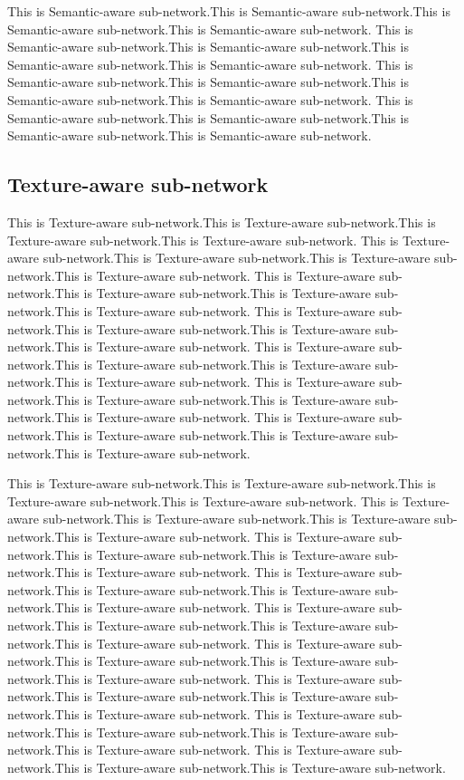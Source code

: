 \documentclass{article}
\begin{document}
This is Semantic-aware sub-network.This is Semantic-aware sub-network.This is Semantic-aware sub-network.This is Semantic-aware sub-network.
This is Semantic-aware sub-network.This is Semantic-aware sub-network.This is Semantic-aware sub-network.This is Semantic-aware sub-network.
This is Semantic-aware sub-network.This is Semantic-aware sub-network.This is Semantic-aware sub-network.This is Semantic-aware sub-network.
This is Semantic-aware sub-network.This is Semantic-aware sub-network.This is Semantic-aware sub-network.This is Semantic-aware sub-network.

\subsection{Texture-aware sub-network}
\label{Texture-aware sub-network}
This is Texture-aware sub-network.This is Texture-aware sub-network.This is Texture-aware sub-network.This is Texture-aware sub-network.
This is Texture-aware sub-network.This is Texture-aware sub-network.This is Texture-aware sub-network.This is Texture-aware sub-network.
This is Texture-aware sub-network.This is Texture-aware sub-network.This is Texture-aware sub-network.This is Texture-aware sub-network.
This is Texture-aware sub-network.This is Texture-aware sub-network.This is Texture-aware sub-network.This is Texture-aware sub-network.
This is Texture-aware sub-network.This is Texture-aware sub-network.This is Texture-aware sub-network.This is Texture-aware sub-network.
This is Texture-aware sub-network.This is Texture-aware sub-network.This is Texture-aware sub-network.This is Texture-aware sub-network.
This is Texture-aware sub-network.This is Texture-aware sub-network.This is Texture-aware sub-network.This is Texture-aware sub-network.

This is Texture-aware sub-network.This is Texture-aware sub-network.This is Texture-aware sub-network.This is Texture-aware sub-network.
This is Texture-aware sub-network.This is Texture-aware sub-network.This is Texture-aware sub-network.This is Texture-aware sub-network.
This is Texture-aware sub-network.This is Texture-aware sub-network.This is Texture-aware sub-network.This is Texture-aware sub-network.
This is Texture-aware sub-network.This is Texture-aware sub-network.This is Texture-aware sub-network.This is Texture-aware sub-network.
This is Texture-aware sub-network.This is Texture-aware sub-network.This is Texture-aware sub-network.This is Texture-aware sub-network.
This is Texture-aware sub-network.This is Texture-aware sub-network.This is Texture-aware sub-network.This is Texture-aware sub-network.
This is Texture-aware sub-network.This is Texture-aware sub-network.This is Texture-aware sub-network.This is Texture-aware sub-network.
This is Texture-aware sub-network.This is Texture-aware sub-network.This is Texture-aware sub-network.This is Texture-aware sub-network.
This is Texture-aware sub-network.This is Texture-aware sub-network.This is Texture-aware sub-network.
\end{document}
